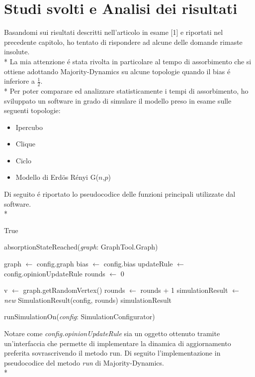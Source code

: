 \documentclass[../Tesi.tex]{subfiles}
\begin{document}
\chapter{Studi svolti e Analisi dei risultati}
Basandomi sui risultati descritti nell'articolo in esame [1] e riportati nel precedente capitolo, ho tentato di rispondere ad alcune delle domande rimaste insolute.\\*
La mia attenzione \'e stata rivolta in particolare al tempo di assorbimento che si ottiene adottando Majority-Dynamics su alcune topologie quando il bias \'e inferiore a $\frac{1}{2}$.\\*
Per poter comparare ed analizzare statisticamente i tempi di assorbimento, ho sviluppato un software in grado di simulare il modello preso in esame sulle seguenti topologie:
 \begin{itemize}
\item Ipercubo
\item Clique
\item Ciclo
\item Modello di Erd{\"o}s R\'enyi G($n$,$p$)
\end{itemize}
Di seguito \'e riportato lo pseudocodice delle funzioni principali utilizzate dal software.\\*

\begin{algorithm}[H]
  \Return True\;
\caption{absorptionStateReached(\emph{graph}: GraphTool.Graph)}
\end{algorithm}
 
 \hfill \break
 
\begin{algorithm}[H]
  graph $\gets$ config.graph\;
  bias $\gets$ config.bias\;
  updateRule $\gets$ config.opinionUpdateRule\;
  rounds $\gets$ 0\;

  {
    v $\gets$ graph.getRandomVertex()\;
    rounds $\gets$ rounds + 1\;
  }
  simulationResult $\gets$ \emph{new} SimulationResult(config, rounds)\;
  \Return simulationResult\;
\caption{runSimulationOn(\emph{config}: SimulationConfigurator)}
\end{algorithm}
 
\hfill \break

Notare come \emph{config.opinionUpdateRule} sia un oggetto ottenuto tramite un'interfaccia che permette di implementare la dinamica di aggiornamento preferita sovrascrivendo il metodo run. Di seguito l'implementazione in pseudocodice del metodo \emph{run} di Majority-Dynamics.\\*
\end{document}

